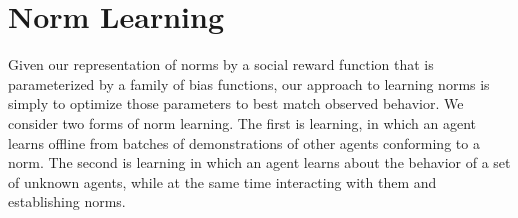 
\section{Norm Learning}
\label{sec:learning}

Given our representation of norms by a social reward function that is
parameterized by a family of bias functions, our approach to learning
norms is simply to optimize those parameters to best match observed
behavior.  We consider two forms of norm learning.  The first is
 learning, in which an agent learns offline from batches
of demonstrations of other agents conforming to a norm.  The second is
 learning in which an agent learns about the
behavior of a set of unknown agents, while at the same time
interacting with them and establishing norms.



